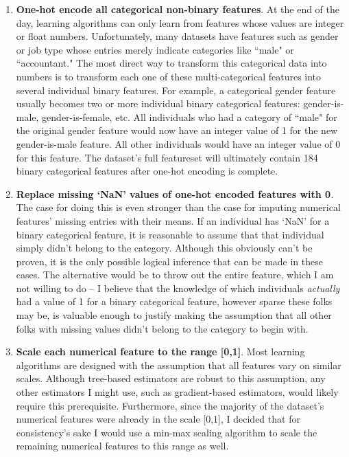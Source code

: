 \documentclass[12pt, letterpaper]{article}
\begin{document}
\begin{enumerate}
  \item \textbf{One-hot encode all categorical non-binary features}. At the end of the day, learning algorithms can only learn from features whose values are integer or float numbers. Unfortunately, many datasets have features such as gender or job type whose entries merely indicate categories like ``male" or ``accountant." The most direct way to transform this categorical data into numbers is to transform each one of these multi-categorical features into several individual binary features. For example, a categorical gender feature usually becomes two or more individual binary categorical features: gender-is-male, gender-is-female, etc. All individuals who had a category of ``male" for the original gender feature would now have an integer value of 1 for the new gender-is-male feature. All other individuals would have an integer value of 0 for this feature. The dataset's full featureset will ultimately contain 184 binary categorical features after one-hot encoding is complete.
  \item \textbf{Replace missing `NaN' values of one-hot encoded features with 0}. The case for doing this is even stronger than the case for imputing numerical features' missing entries with their means. If an individual has `NaN' for a binary categorical feature, it is reasonable to assume that that individual simply didn't belong to the category. Although this obviously can't be proven, it is the only possible logical inference that can be made in these cases. The alternative would be to throw out the entire feature, which I am not willing to do -- I believe that the knowledge of which individuals \textit{actually} had a value of 1 for a binary categorical feature, however sparse these folks may be, is valuable enough to justify making the assumption that all other folks with missing values didn't belong to the category to begin with.
  \item \textbf{Scale each numerical feature to the range [0,1]}. Most learning algorithms are designed with the assumption that all features vary on similar scales. Although tree-based estimators are robust to this assumption, any other estimators I might use, such as gradient-based estimators, would likely require this prerequisite. Furthermore, since the majority of the dataset's numerical features were already in the scale [0,1], I decided that for consistency's sake I would use a min-max scaling algorithm to scale the remaining numerical features to this range as well.
\end{enumerate}
\end{document}
